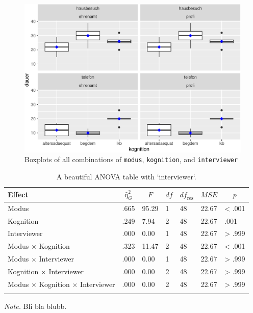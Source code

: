 \documentclass[
  doc,floatsintext]{apa6}
\begin{document}
\begin{figure}
\centering
\includegraphics{desc_aov_files/figure-latex/df3boxplot-1.pdf}
\caption{\label{fig:df3boxplot}Boxplots of all combinations of \texttt{modus}, \texttt{kognition}, and \texttt{interviewer}}
\end{figure}

\begin{table}[tbp]

\begin{center}
\begin{threeparttable}

\caption{\label{tab:tabanova3}A beautiful ANOVA table with `interviewer`.}

\begin{tabular}{lllllll}
\toprule
Effect & \multicolumn{1}{c}{$\hat{\eta}^2_G$} & \multicolumn{1}{c}{$F$} & \multicolumn{1}{c}{$\mathit{df}$} & \multicolumn{1}{c}{$\mathit{df}_{\mathrm{res}}$} & \multicolumn{1}{c}{$\mathit{MSE}$} & \multicolumn{1}{c}{$p$}\\
\midrule
Modus & .665 & 95.29 & 1 & 48 & 22.67 & < .001\\
Kognition & .249 & 7.94 & 2 & 48 & 22.67 & .001\\
Interviewer & .000 & 0.00 & 1 & 48 & 22.67 & > .999\\
Modus $\times$ Kognition & .323 & 11.47 & 2 & 48 & 22.67 & < .001\\
Modus $\times$ Interviewer & .000 & 0.00 & 1 & 48 & 22.67 & > .999\\
Kognition $\times$ Interviewer & .000 & 0.00 & 2 & 48 & 22.67 & > .999\\
Modus $\times$ Kognition $\times$ Interviewer & .000 & 0.00 & 2 & 48 & 22.67 & > .999\\
\bottomrule
\addlinespace
\end{tabular}

\begin{tablenotes}[para]
\normalsize{\textit{Note.} Bli bla blubb.}
\end{tablenotes}

\end{threeparttable}
\end{center}

\end{table}
\end{document}
